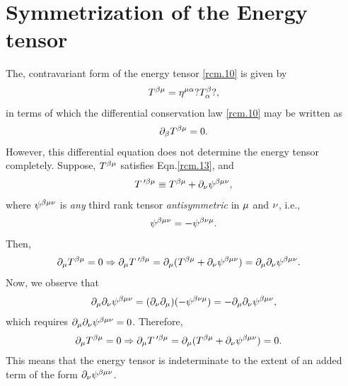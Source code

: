 \section{Symmetrization of the Energy tensor} 
The, contravariant form of the energy tensor \eqref{rcm.10} 
is  given by 
\begin{align} \label{rcm.12} 
T^{{\beta}{\mu}}=\eta^{{\mu}{\alpha}}?T^{{\beta}}_{{\alpha}}?, 
\end{align} 
in terms of which the  {differential conservation law} 
\eqref{rcm.10}  may be written as
\begin{align} \label{rcm.13}
{\ensuremath{\partial}}_ {{\beta}} T^{{\beta}{\mu}}=0.
\end{align}
However, this differential equation  does not determine the 
energy tensor completely. Suppose,   $T^{{\beta}{\mu}}$ 
satisfies  Eqn.\eqref{rcm.13}, and
\begin{align} \label{rcm.14}
T\,'^{{\beta}{\mu}} \equiv
T^{{\beta}{\mu}}+{\partial}_{{\nu}} \psi^{{\beta}{\mu}{\nu}},
\end{align}
where $\psi^{{\beta}{\mu}{\nu}} $ is  \textsl{any}  third rank 
tensor \textsl{antisymmetric} in ${\mu} $ and ${\nu} $, i.e.,
\begin{align}\label{rcm.15}
\psi^{{\beta}{\mu}{\nu}}=-\psi^{{\beta}{\nu}{\mu}}.
\end{align}
Then,
\begin{align} \label{rcm.16}
&{\partial}_{{\mu}} T^{{\beta}{\mu}}=0\Rightarrow{\ensuremath{\partial}}_{{\mu}}
T\,'^{{\beta}{\mu}}={\partial}_{{\mu}} (T^{{\beta}{\mu}}+
{\partial}_ {{\nu}} \psi^{{\beta}{\mu}{\nu}})={\partial}_{{\mu}}{\partial}_{{\nu}} 
\psi^{{\beta}{\mu}{\nu}}.
\end{align}
Now,  we observe that
\begin{align}\label{rcm.17}
{\ensuremath{\partial}}_{{\mu}}{\partial}_{{\nu}}   \psi^{{\beta}{\mu}{\nu}}
=({\partial}_{{\nu}}{\partial}_{{\mu}})(-\psi^{{\beta}{\nu}{\mu}})=-
{\partial}_{{\mu}}{\partial}_{{\nu}}\psi^{{\beta}{\mu}{\nu}},
\end{align}
which requires ${\partial}_{{\mu}}{\partial}_{{\nu}}   \psi^{{\beta}{\mu}{\nu}} 
=0$. Therefore,
\begin{align} \label{rcm.18}
{\ensuremath{\partial}}_{{\mu}} T^{{\beta}{\mu}}&=0 \Rightarrow{\ensuremath{\partial}}_{{\mu}}
T\,'^{{\beta}{\mu}}={\partial}_{{\mu}} (T^{{\beta}{\mu}}+
{\partial}_ {{\nu}} \psi^{{\beta}{\mu}{\nu}})=0.
\end{align}
This means that the energy tensor is indeterminate to the 
extent of an added term of the form ${\partial}_ {{\nu}} 
\psi^{{\beta}{\mu}{\nu}}$.

